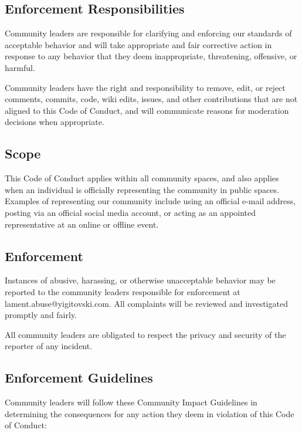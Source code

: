 \subsection{Enforcement
Responsibilities}\label{enforcement-responsibilities}

Community leaders are responsible for clarifying and enforcing our
standards of acceptable behavior and will take appropriate and fair
corrective action in response to any behavior that they deem
inappropriate, threatening, offensive, or harmful.

Community leaders have the right and responsibility to remove, edit, or
reject comments, commits, code, wiki edits, issues, and other
contributions that are not aligned to this Code of Conduct, and will
communicate reasons for moderation decisions when appropriate.

\subsection{Scope}\label{scope}

This Code of Conduct applies within all community spaces, and also
applies when an individual is officially representing the community in
public spaces. Examples of representing our community include using an
official e-mail address, posting via an official social media account,
or acting as an appointed representative at an online or offline event.

\subsection{Enforcement}\label{enforcement}

Instances of abusive, harassing, or otherwise unacceptable
behavior may be reported to the community leaders responsible for
enforcement at lament.abuse@yigitovski.com. All complaints will be
reviewed and investigated promptly and fairly.

All community leaders are obligated to respect the privacy and security
of the reporter of any incident.

\subsection{Enforcement Guidelines}\label{enforcement-guidelines}

Community leaders will follow these Community Impact Guidelines in
determining the consequences for any action they deem in violation of
this Code of Conduct:

